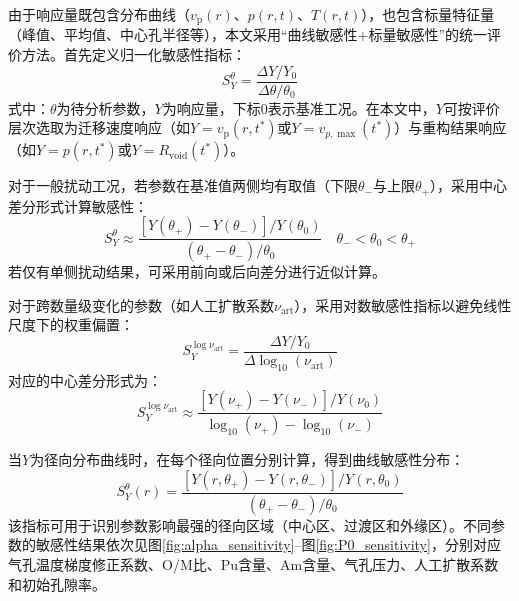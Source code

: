 由于响应量既包含分布曲线（$v_{\mathrm p}(r)$、$p(r,t)$、$T(r,t)$），也包含标量特征量（峰值、平均值、中心孔半径等），本文采用“曲线敏感性+标量敏感性”的统一评价方法。首先定义归一化敏感性指标：
\begin{equation}
	S_Y^\theta = \frac{\Delta Y / Y_0}{\Delta \theta / \theta_0}
	\label{eq:sensitivity_definition}
\end{equation}
\noindent 式中：$\theta$为待分析参数，$Y$为响应量，下标$0$表示基准工况。在本文中，$Y$可按评价层次选取为迁移速度响应（如$Y=v_{\mathrm p}(r,t^*)$或$Y=v_{p,\max}(t^*)$）与重构结果响应（如$Y=p(r,t^*)$或$Y=R_{\mathrm{void}}(t^*)$）。

对于一般扰动工况，若参数在基准值两侧均有取值（下限$\theta_-$与上限$\theta_+$），采用中心差分形式计算敏感性：
\begin{equation}
	S_Y^{\theta}\approx
	\frac{\left[Y(\theta_+)-Y(\theta_-)\right]/Y(\theta_0)}{\left(\theta_+-\theta_-\right)/\theta_0}
	\quad \theta_-<\theta_0<\theta_+
\end{equation}
若仅有单侧扰动结果，可采用前向或后向差分进行近似计算。

对于跨数量级变化的参数（如人工扩散系数$\nu_{\mathrm{art}}$），采用对数敏感性指标以避免线性尺度下的权重偏置：
\begin{equation}
	S_Y^{\log \nu_{\mathrm{art}}}=
	\frac{\Delta Y/Y_0}{\Delta \log_{10}(\nu_{\mathrm{art}})}
\end{equation}
对应的中心差分形式为：
\begin{equation}
	S_Y^{\log \nu_{\mathrm{art}}}\approx
	\frac{\left[Y(\nu_+)-Y(\nu_-)\right]/Y(\nu_0)}{\log_{10}(\nu_+)-\log_{10}(\nu_-)}
\end{equation}

当$Y$为径向分布曲线时，在每个径向位置分别计算，得到曲线敏感性分布：
\begin{equation}
	S_Y^{\theta}(r)=
	\frac{\left[Y(r,\theta_+)-Y(r,\theta_-)\right]/Y(r,\theta_0)}{\left(\theta_+-\theta_-\right)/\theta_0}
\end{equation}
该指标可用于识别参数影响最强的径向区域（中心区、过渡区和外缘区）。不同参数的敏感性结果依次见图\ref{fig:alpha_sensitivity}--图\ref{fig:P0_sensitivity}，分别对应气孔温度梯度修正系数、O/M比、Pu含量、Am含量、气孔压力、人工扩散系数和初始孔隙率。

